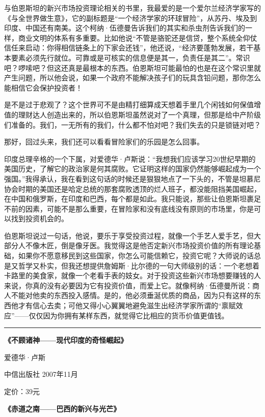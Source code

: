 与伯恩斯坦的新兴市场投资理论相关的书里，我最爱的是一个爱尔兰经济学家写的《与全世界做生意》，它的副标题是``一个经济学家的环球冒险''，从苏丹、埃及到印度、中国还有南美。这个柯纳·伍德曼告诉我们的其实和杀虫剂告诉我们的一样，商业文明的体系有多重要。比如他说``不管是骆驼还是信贷，整个系统全仰仗信任来启动：你得相信链条上的下家会还钱''，他还说，``经济要蓬勃发展，若干基本要素必须先行就位。可靠或是可核实的信息便是其一，负责任是其二''。常识吧？啰嗦吧？但这还真是最根本的东西。伯恩斯坦可能最怕的也是在这个常识里就产生问题，所以他会说，如果一个政府不能解决孩子们的玩具含铅问题，那你怎么能相信它会保护投资者！

是不是过于悲观了？这个世界可不是由精打细算成天想着手里几个闲钱如何保值增值的理财达人创造出来的，所以伯恩斯坦虽然说对了一个真理，但那是给中产阶级们准备的。我们，一无所有的我们，什么都不怕对吧？我们失去的只是锁链对吧？

那好，回过头来，我们还可以看看冒险家们的乐园是怎么回事。

印度总理辛格的一个下属，对爱德华·卢斯说：``我想我们应该学习20世纪早期的美国历史，了解它的政治家是何其腐败。它证明这样的国家仍然能够崛起成为一个强国。''我得承认，我在看到这句话的时候还是狠狠地点了一下头的，不管是坦慕尼协会时期的美国还是哈定总统的那套腐败透顶的烂人班子，都没能阻挡美国崛起，在中国和俄罗斯，在印度和巴西，每个都是如此。我只能说，那些让伯恩斯坦裹足不前的因素，可能不是那么重要，在冒险家和没有底线没有原则的市场里，你是可以找到投资机会的。

伯恩斯坦说过一句话，他说，要乐于享受投资过程，就像一个手艺人爱手艺，但大部分人不像木匠，倒是像牙医。我觉得这是他否定新兴市场投资价值的所有理论基础，如果你不愿意移民到这些国家，你怎么可能信赖它，投资它呢？大师说的话总是又哲学又朴实，但我还想提供詹姆斯·比尔德的一句大师级别的话：一个老想着卡路里的美食家，就像一个老看手表的妓女。对于投资这些新兴市场想要赚钱的人来说，你真的没有必要因为它有投资价值，而爱上它。就像柯纳·伍德曼所说：商人不能对他卖的东西投入感情。是的，他必须垂涎优质的商品，因为只有这样的东西他才有信心去卖；可他又得小心翼翼地避免滋生出经济学家所谓的``禀赋效应''------仅仅因为你拥有某样东西，就觉得它比相应的货币价值更值钱。

\begin{center}\rule{3in}{0.4pt}\end{center}

\textbf{《不顾诸神------现代印度的奇怪崛起》}

爱德华·卢斯

中信出版社 2007年11月

定价：39元

\textbf{《赤道之南------巴西的新兴与光芒》}

